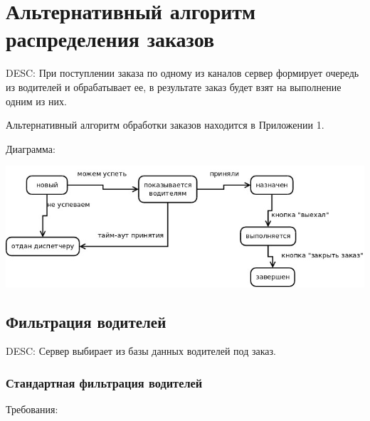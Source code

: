 \section{Альтернативный алгоритм распределения заказов}

	DESC:  При поступлении заказа по одному из каналов сервер формирует очередь из водителей и обрабатывает ее, в результате заказ будет взят на выполнение одним из них.

	Альтернативный алгоритм обработки заказов находится в Приложении 1.

	Диаграмма:

	\includegraphics[width=\textwidth]{images/appendices/alt_alg}

	\subsection{Фильтрация водителей}

		DESC: Сервер выбирает из базы данных водителей под заказ.

		\subsubsection{Стандартная фильтрация водителей}

			Требования:

